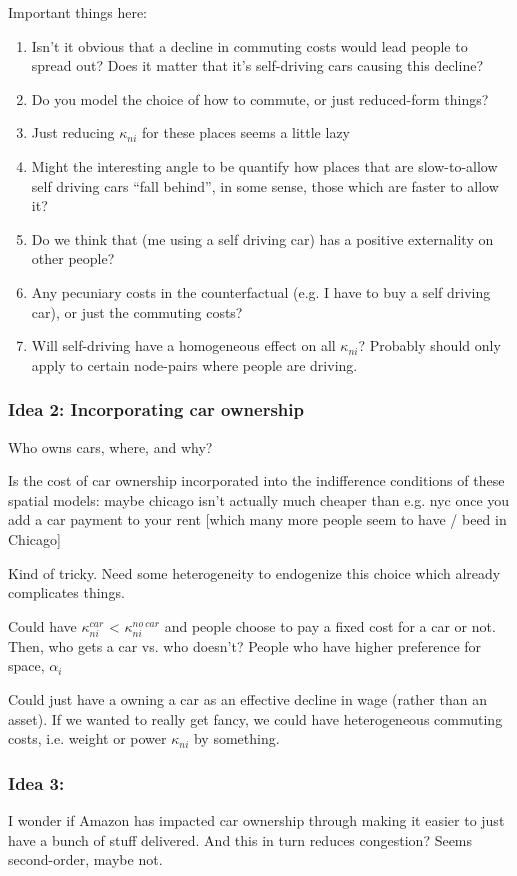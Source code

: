 \documentclass{article}
\begin{document}
Important things here:
\begin{enumerate}
    \item Isn't it obvious that a decline in commuting costs would lead people to spread out? Does it matter that it's self-driving cars causing this decline? 

    \item Do you model the choice of how to commute, or just reduced-form things?
\item Just reducing $\kappa_{ni}$ for these places seems a little lazy
\item Might the interesting angle to be quantify how places that are slow-to-allow self driving cars ``fall behind'', in some sense, those which are faster to allow it? 
\item Do we think that (me using a self driving car) has a positive externality on other people?
\item Any pecuniary costs in the counterfactual (e.g. I have to buy a self driving car), or just the commuting costs?
\item Will self-driving have a homogeneous effect on all $\kappa_{ni}$? Probably should only apply to certain node-pairs where people are driving.
\end{enumerate}

\subsubsection{Idea 2: Incorporating car ownership}
Who owns cars, where, and why?

Is the cost of car ownership incorporated into the indifference conditions of these spatial models: maybe chicago isn't actually much cheaper than e.g. nyc once you add a car payment to your rent [which many more people seem to have / beed in Chicago] 


Kind of tricky. Need some heterogeneity to endogenize this choice which already complicates things.

Could have $\kappa^{car}_{ni}$ <
$\kappa^{no \ car}_{ni} $ and people choose to pay a fixed cost for a car or not. 
Then, who gets a car vs. who doesn't? 
People who have higher preference for space, $\alpha_i$

Could just have a owning a car as an effective decline in wage (rather than an asset).
If we wanted to really get fancy, we could have heterogeneous commuting costs, i.e. weight or power $\kappa_{ni}$ by something. 


\subsubsection{Idea 3: }
I wonder if Amazon has impacted car ownership through making it easier to just have a bunch of stuff delivered. 
And this in turn reduces congestion? Seems second-order, maybe not.
\end{document}
